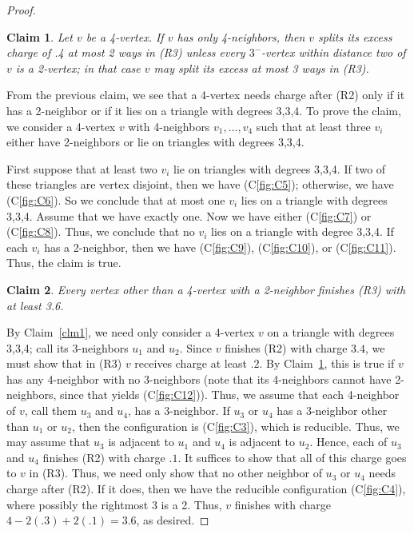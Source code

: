 \documentclass[12pt]{article}
\theoremstyle{plain}
\newtheorem{clm}{Claim}
\theoremstyle{definition}
\theoremstyle{remark}
\begin{document}
\begin{proof}
	\begin{clm}
		Let $v$ be a 4-vertex.  If $v$ has only 4-neighbors, then $v$ splits its excess
		charge of .4 at most 2 ways in (R3) \emph{unless} every $3^-$-vertex within
		distance two of $v$ is a 2-vertex; in that case $v$ may split its excess at most
		3 ways in (R3).
		\label{clm2}
	\end{clm}
	From the previous claim, we see that a 4-vertex needs charge after (R2) only if
	it has a 2-neighbor or if it lies on a triangle with degrees 3,3,4.  To prove the
	claim, we consider a 4-vertex $v$ with 4-neighbors $v_1,\ldots, v_4$ such that
	at least three $v_i$ either have 2-neighbors or lie on triangles with degrees 3,3,4. 
	
	First suppose that at least two $v_i$ lie on triangles with degrees 3,3,4.
	If two of these triangles are vertex disjoint, then we have (C\ref{fig:C5});
	otherwise, we have (C\ref{fig:C6}).  So we conclude that at most one $v_i$ lies
	on a triangle with degrees 3,3,4.  Assume that we have exactly one.
	Now we have either (C\ref{fig:C7}) or (C\ref{fig:C8}).  Thus, we conclude that
	no $v_i$ lies on a triangle with degree 3,3,4.  If each $v_i$ has a
	2-neighbor, then we have (C\ref{fig:C9}), (C\ref{fig:C10}), or (C\ref{fig:C11}).
	Thus, the claim is true.
	
	\begin{clm}
		Every vertex other than a 4-vertex with a 2-neighbor finishes (R3) with at least 3.6.
		\label{clm3}
	\end{clm}
	By Claim~\ref{clm1}, we need only consider a 4-vertex $v$ on a triangle with
	degrees 3,3,4; call its 3-neighbors $u_1$ and $u_2$.
	Since $v$ finishes (R2) with charge $3.4$, we must show that in
	(R3) $v$ receives charge at least $.2$.  By Claim~\ref{clm2}, this is true if
	$v$ has any 4-neighbor with no 3-neighbors (note that its 4-neighbors cannot
	have 2-neighbors, since that yields (C\ref{fig:C12})).  Thus, we assume that each
	4-neighbor of $v$, call them $u_3$ and $u_4$, has a 3-neighbor.  If $u_3$ or
	$u_4$ has a 3-neighbor other than $u_1$ or $u_2$, then the configuration is
	(C\ref{fig:C3}), which is reducible.  Thus, we may assume that $u_3$ is adjacent
	to $u_1$ and $u_4$ is adjacent to $u_2$.  Hence, each of $u_3$ and $u_4$
	finishes (R2) with charge $.1$.  It suffices to show that
	all of this charge goes to $v$ in (R3).  Thus, we need only show that no other
	neighbor of $u_3$ or $u_4$ needs charge after (R2).  If it does, then we have
	the reducible configuration (C\ref{fig:C4}), where possibly the rightmost 3 is a
	2.  Thus, $v$ finishes with charge $4-2(.3)+2(.1)=3.6$, as desired.
	

\end{proof}
\end{document}
